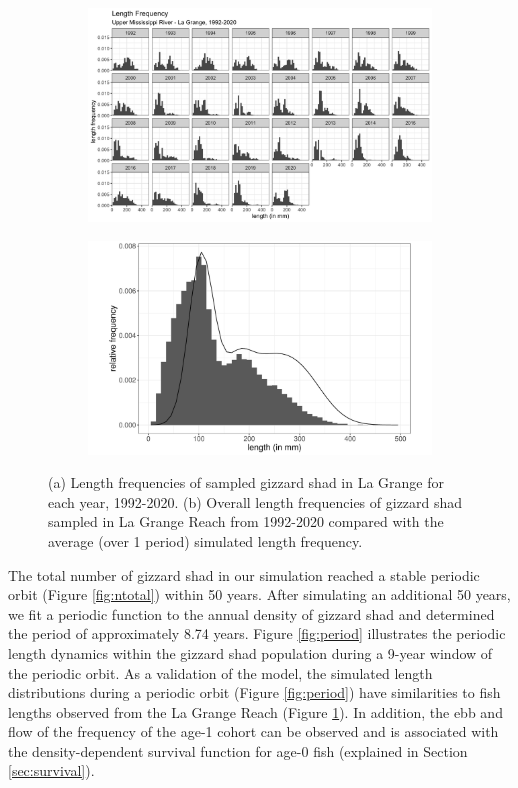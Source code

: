 \documentclass[preprint,review,12pt,authoryear]{elsarticle}
\begin{document}
\begin{figure}
\centering
\begin{subfigure}[b]{.43\textwidth}
  \includegraphics[width=\textwidth]{figures/LTRMlg.png}
   \caption{}
  \label{fig:LTRMlg}
\end{subfigure}
\begin{subfigure}[b]{.43\textwidth}
   \includegraphics[width=\textwidth]{figures/lagrange.pdf}
     \caption{}
\label{fig:lagrange}
\end{subfigure}
\caption{(a) Length frequencies of sampled gizzard shad in La Grange for each year, 1992-2020. (b) Overall length frequencies of gizzard shad sampled in La Grange Reach from 1992-2020 compared with the average (over 1 period) simulated length frequency.}
\end{figure}    
The total number of gizzard shad in our simulation reached a stable periodic orbit (Figure \ref{fig:ntotal}) within 50 years. 
After simulating an additional 50 years, we fit a periodic function to the annual density of gizzard shad and determined the period of approximately 8.74 years. 
Figure \ref{fig:period} illustrates the periodic length dynamics within the gizzard shad population during a 9-year window of the periodic orbit.  
As a validation of the model, the simulated length distributions during a periodic orbit (Figure \ref{fig:period}) have similarities to fish lengths observed from the La Grange Reach (Figure \ref{fig:LTRMlg}). 
In addition, the ebb and flow of the frequency of the age-1 cohort can be observed and is associated with the density-dependent survival function for age-0 fish (explained in Section \ref{sec:survival}).
\end{document}
